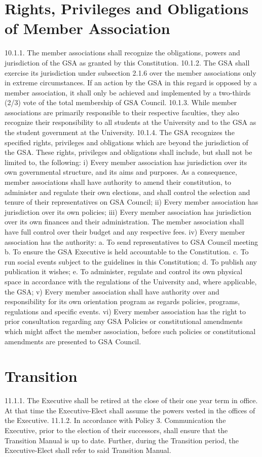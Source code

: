 \documentclass{article}
\begin{document}
\section{Rights, Privileges and Obligations of Member Association }
10.1.1. The member associations shall recognize the obligations, powers 
and jurisdiction of the GSA as granted by this Constitution. 
10.1.2. The GSA shall exercise its jurisdiction under subsection 2.1.6 over 
the member associations only in extreme circumstances. If an action 
by the GSA in this regard is opposed by a member association, it shall 
only be achieved and implemented by a two-thirds (2/3) vote of the 
total membership of GSA Council. 
10.1.3. While member associations are primarily responsible to their 
respective faculties, they also recognize their responsibility to all 
students at the University and to the GSA as the student government at 
the University. 
10.1.4. The GSA recognizes the specified rights, privileges and obligations 
which are beyond the jurisdiction of the GSA. These rights, privileges 
and obligations shall include, but shall not be limited to, the following: 
i) Every member association has jurisdiction over its own governmental 
structure, and its aims and purposes. As a consequence, member 
associations shall have authority to amend their constitution, to 
administer and regulate their own elections, and shall control the 
selection and tenure of their representatives on GSA Council; 
ii) Every member association has jurisdiction over its own policies; 
iii) Every member association has jurisdiction over its own finances and 
their administration. The member association shall have full control 
over their budget and any respective fees. 
iv) Every member association has the authority: 
a. To send representatives to GSA Council meeting 
b. To ensure the GSA Executive is held accountable to the 
 Constitution. 
c. To run social events subject to the guidelines in this Constitution; 
d. To publish any publication it wishes; 
e. To administer, regulate and control its own physical space in 
 accordance with the regulations of the University and, where 
 applicable, the GSA; 
v) Every member association shall have authority over and responsibility 
for its own orientation program as regards policies, programs, 
regulations and specific events. 
vi) Every member association has the right to prior consultation regarding 
any GSA Policies or constitutional amendments which might affect the member association, before such policies or constitutional 
amendments are presented to GSA Council. 
\section{Transition }
11.1.1. The Executive shall be retired at the close of their one year term in 
office. At that time the Executive-Elect shall assume the powers vested 
in the offices of the Executive. 
11.1.2. In accordance with Policy 3. Communication the Executive, prior 
to the election of their successors, shall ensure that the Transition 
Manual is up to date. Further, during the Transition period, the 
Executive-Elect shall refer to said Transition Manual. 
\end{document}
